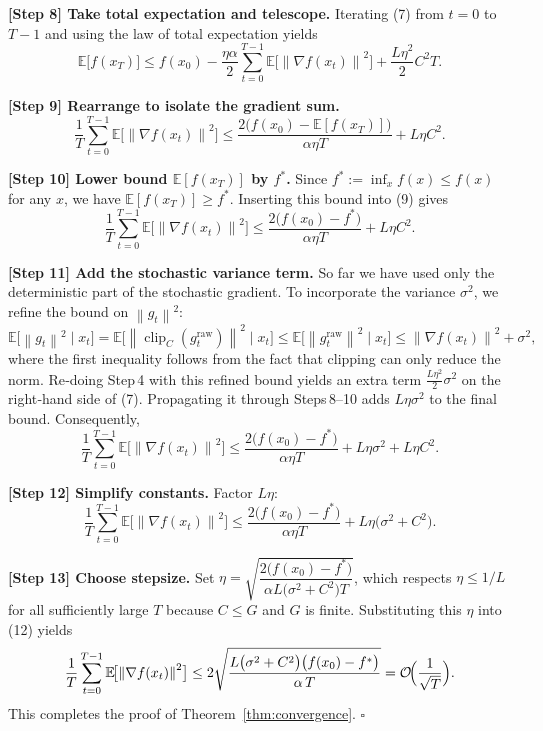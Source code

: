 \documentclass{article}
\newcommand{\EE}{\mathbb{E}}
\newcommand{\norm}[1]{\left\lVert#1\right\rVert}
\newcommand{\clip}{\operatorname{clip}}
\begin{document}
\noindent\textbf{[Step 8] Take total expectation and telescope.}  
Iterating (7) from $t=0$ to $T-1$ and using the law of total expectation yields
\[
\EE\!\bigl[f(x_{T})\bigr]
\le f(x_{0})
   -\frac{\eta\alpha}{2}\sum_{t=0}^{T-1}\EE\!\bigl[\norm{\nabla f(x_{t})}^{2}\bigr]
   +\frac{L\eta^{2}}{2}C^{2}T.
\tag{8}
\]

\noindent\textbf{[Step 9] Rearrange to isolate the gradient sum.}
\[
\frac{1}{T}\sum_{t=0}^{T-1}\EE\!\bigl[\norm{\nabla f(x_{t})}^{2}\bigr]
\le \frac{2\bigl(f(x_{0})-\EE[f(x_{T})]\bigr)}{\alpha\eta T}
     +L\eta C^{2}.
\tag{9}
\]

\noindent\textbf{[Step 10] Lower bound $\EE[f(x_{T})]$ by $f^{*}$.}  
Since $f^{*}:=\inf_{x}f(x)\le f(x)$ for any $x$, we have $\EE[f(x_{T})]\ge f^{*}$. Inserting this bound into (9) gives
\[
\frac{1}{T}\sum_{t=0}^{T-1}\EE\!\bigl[\norm{\nabla f(x_{t})}^{2}\bigr]
\le \frac{2\bigl(f(x_{0})-f^{*}\bigr)}{\alpha\eta T}
     +L\eta C^{2}.
\tag{10}
\]

\noindent\textbf{[Step 11] Add the stochastic variance term.}  
So far we have used only the deterministic part of the stochastic gradient. To incorporate the variance $\sigma^{2}$, we refine the bound on $\norm{g_{t}}^{2}$:
\[
\EE\!\bigl[\norm{g_{t}}^{2}\mid x_{t}\bigr]
= \EE\!\bigl[\norm{\clip_{C}(g^{\text{raw}}_{t})}^{2}\mid x_{t}\bigr]
\le \EE\!\bigl[\norm{g^{\text{raw}}_{t}}^{2}\mid x_{t}\bigr]
\le \norm{\nabla f(x_{t})}^{2}+\sigma^{2},
\]
where the first inequality follows from the fact that clipping can only reduce the norm. Re‑doing Step 4 with this refined bound yields an extra term $ \frac{L\eta^{2}}{2}\sigma^{2}$ on the right‑hand side of (7). Propagating it through Steps 8–10 adds $L\eta\sigma^{2}$ to the final bound. Consequently,
\[
\boxed{
\frac{1}{T}\sum_{t=0}^{T-1}\EE\!\bigl[\norm{\nabla f(x_{t})}^{2}\bigr]
\le \frac{2\bigl(f(x_{0})-f^{*}\bigr)}{\alpha\eta T}
     +L\eta\sigma^{2}
     +L\eta C^{2}.
}
\tag{11}
\]

\noindent\textbf{[Step 12] Simplify constants.}  
Factor $L\eta$:
\[
\frac{1}{T}\sum_{t=0}^{T-1}\EE\!\bigl[\norm{\nabla f(x_{t})}^{2}\bigr]
\le \frac{2\bigl(f(x_{0})-f^{*}\bigr)}{\alpha\eta T}
     +L\eta\bigl(\sigma^{2}+C^{2}\bigr).
\tag{12}
\]

\noindent\textbf{[Step 13] Choose stepsize.}  
Set $\eta = \sqrt{\dfrac{2\bigl(f(x_{0})-f^{*}\bigr)}{\alpha L\bigl(\sigma^{2}+C^{2}\bigr)T}}$, which respects $\eta\le 1/L$ for all sufficiently large $T$ because $C\le G$ and $G$ is finite. Substituting this $\eta$ into (12) yields
\[
\frac{1}{T}\sum_{t=0}^{T-1}\EE\!\bigl[\norm{\nabla f(x_{t})}^{2}\bigr]
\le 2\sqrt{\frac{L\bigl(\sigma^{2}+C^{2}\bigr)\bigl(f(x_{0})-f^{*}\bigr)}{\alpha\,T}}
      =\mathcal{O}\!\Bigl(\frac{1}{\sqrt{T}}\Bigr).
\]
This completes the proof of Theorem~\ref{thm:convergence}. \hfill $\square$
\end{document}

